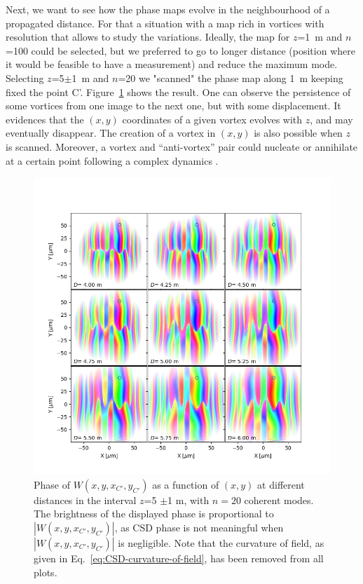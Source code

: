 \documentclass[%
 reprint,
 amsmath,amssymb,
 aps,
]{revtex4-1}
\begin{document}
Next, we want to see how the phase maps evolve in the neighbourhood of a propagated distance. For that a situation with a map rich in vortices with resolution that allows to study the variations. Ideally, the map for $z$=1~m and $n$=100 could be selected, but we preferred to go to longer distance (position where it would be feasible to have a measurement) and reduce the maximum mode. Selecting $z$=5$\pm$1~m and $n$=20 we "scanned" the phase map along 1~m keeping fixed the point C'. Figure~\ref{neighbour} shows the result. One can observe the persistence of some vortices from one image to the next one, but with some displacement. It evidences that the $(x,y)$ coordinates of a given vortex evolves with $z$, and may eventually disappear. The creation of a vortex in $(x,y)$ is also possible when $z$ is scanned. Moreover, a vortex and ``anti-vortex'' pair could nucleate or annihilate at a certain point following a complex dynamics \cite{TopologicalReactionsCohVortices, Marasinghe2011}.

\begin{figure}
\includegraphics[width=1.0\textwidth]{Figures/vx_id16a_C5_propagated_neighbour_mode0019.png}
\caption{Phase of $W(x,y,x_{C'},y_{C'})$ as a function of $(x,y)$ at different distances in the interval $z$=5 $\pm$1 m, with $n=20$ coherent modes. The brightness of the displayed phase is proportional to $|W(x,y,x_{C'},y_{C'})|$, as CSD phase is not meaningful when $|W(x,y,x_{C'},y_{C'})|$ is negligible. Note that the curvature of field, as given in Eq.~\ref{eq:CSD-curvature-of-field}, has been removed from all plots.}
\label{neighbour}%
\end{figure}
\end{document}
